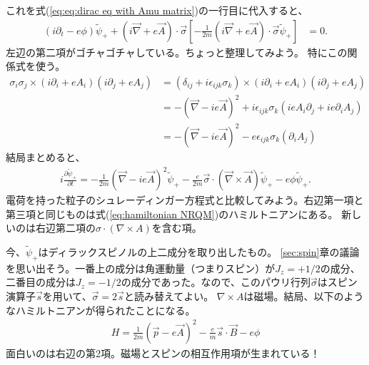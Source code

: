 \documentclass[10pt,a4paper]{jarticle}
\begin{document}
%
これを式(\ref{eq:eq:dirac eq with Amu matrix})の一行目に代入すると、
\begin{align}
(i\partial_t - e \phi) \tilde\psi_+ + ( i \vec\nabla + e\vec A) \cdot \vec\sigma \left[
-\frac{1}{2m} (  i \vec\nabla + e\vec A) \cdot \vec\sigma \tilde\psi_+
 \right] &= 0.
\end{align}
%
左辺の第二項がゴチャゴチャしている。ちょっと整理してみよう。
特にこの関係式を使う。
\begin{align}
\sigma_i \sigma_j \times ( i\partial_i + eA_i  )( i\partial_j + eA_j )
&=
(\delta_{ij} + i\epsilon_{ijk}\sigma_k) \times ( i\partial_i + eA_i  )( i\partial_j + eA_j ) \nonumber\\
&=
-(\vec \nabla - i e \vec A)^2 + i\epsilon_{ijk} \sigma_k (ieA_i \partial_j + ie \partial_i A_j ) \nonumber\\
&=
-(\vec \nabla - i e \vec A)^2 - e\epsilon_{ijk} \sigma_k (\partial_i A_j )
\end{align}
%
結局まとめると、
\begin{align}
i\frac{\partial\tilde\psi_+}{\partial t}
=
-\frac{1}{2m} (\vec \nabla - i e \vec A )^2 \tilde\psi_+
- \frac{e}{2m} \vec\sigma \cdot (\vec \nabla \times \vec A)\tilde\psi_+
- e\phi \tilde\psi_+.
\end{align}
電荷を持った粒子のシュレーディンガー方程式と比較してみよう。右辺第一項と第三項と同じものは式(\ref{eq:hamiltonian NRQM})のハミルトニアンにある。
新しいのは右辺第二項の$\sigma \cdot (\nabla \times A)$を含む項。

今、$\tilde\psi_+$はディラックスピノルの上二成分を取り出したもの。
\ref{sec:spin}章の議論を思い出そう。一番上の成分は角運動量（つまりスピン）が$J_z = + 1/2$の成分、二番目の成分は$J_z = -1/2$の成分であった。なので、このパウリ行列$\vec\sigma$はスピン演算子$\vec s$を用いて、$\vec\sigma = 2\vec s$と読み替えてよい。
$\nabla \times A$は磁場。結局、以下のようなハミルトニアンが得られたことになる。
\begin{align}
H = \frac{1}{2 m}( \vec p - e \vec A)^2 - \frac{e}{m} \vec s \cdot \vec B - e \phi
\end{align}
面白いのは右辺の第2項。磁場とスピンの相互作用項が生まれている！
\end{document}
